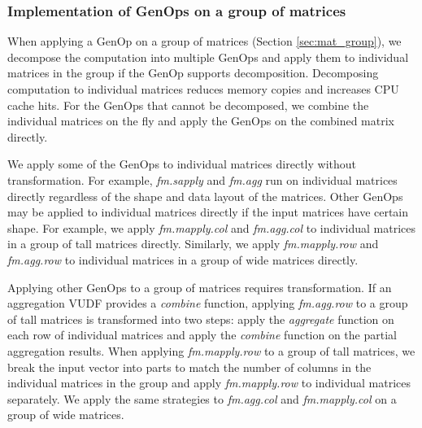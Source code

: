 

\subsubsection{Implementation of GenOps on a group of matrices} \label{sec:group_op}

When applying a GenOp on a group of matrices (Section \ref{sec:mat_group}),
we decompose the computation into multiple GenOps and apply them to individual
matrices in the group if the GenOp supports decomposition. Decomposing computation
to individual matrices reduces memory copies and increases CPU cache hits.
For the GenOps that cannot be decomposed, we combine the individual matrices
on the fly and apply the GenOps on the combined matrix directly.

We apply some of the GenOps to individual matrices directly without
transformation. For example,
\textit{fm.sapply} and \textit{fm.agg} run on individual matrices directly regardless
of the shape and data layout of the matrices. Other GenOps may be applied
to individual matrices directly if the input matrices have certain shape. For
example, we apply \textit{fm.mapply.col} and \textit{fm.agg.col} to individual
matrices in a group of tall matrices directly.  Similarly, we apply
\textit{fm.mapply.row} and \textit{fm.agg.row} to
individual matrices in a group of wide matrices directly. %

Applying other GenOps to a group of matrices requires transformation. If an aggregation
VUDF provides a \textit{combine} function, applying \textit{fm.agg.row} to a group of
tall matrices is transformed into two steps: apply the \textit{aggregate} function on
each row of individual matrices and apply the \textit{combine} function on the partial
aggregation results. When applying \textit{fm.mapply.row} to a group of tall matrices,
we break the input vector into parts to match the number of columns in the individual
matrices in the group and apply \textit{fm.mapply.row} to individual matrices
separately. We apply the same strategies to \textit{fm.agg.col} and
\textit{fm.mapply.col} on a group of wide matrices. 

